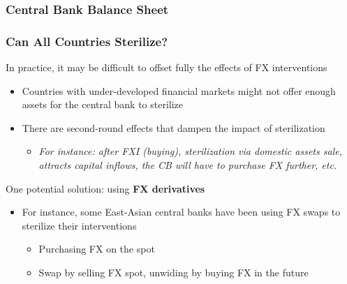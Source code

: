 \documentclass{beamer}
\newenvironment{wideitemize}{\itemize\addtolength{\itemsep}{10pt}}{\enditemize}
\begin{document}
\begin{frame}
\frametitle{Central Bank Balance Sheet}
\end{frame}


\begin{frame}
  \frametitle{Can All Countries Sterilize?}
  \begin{wideitemize}
  \item In practice, it may be difficult to offset fully the effects of FX interventions
    \begin{itemize}
    \item Countries with under-developed financial markets might not offer enough assets for the central bank to sterilize
    \item There are second-round effects that dampen the impact of sterilization
      \begin{itemize}
      \item \emph{For instance: after FXI (buying), sterilization via domestic assets sale, attracts capital inflows, the CB will have to purchase FX further, etc.}
      \end{itemize}
    \end{itemize}
  \item One potential solution: using \textbf{FX derivatives}
    \begin{itemize}
    \item For instance, some East-Asian central banks have been using FX swaps to sterilize their interventions
      \begin{itemize}
      \item Purchasing FX on the spot
      \item Swap by selling FX spot, unwiding by buying FX in the future
      \end{itemize}
    \end{itemize}
  \end{wideitemize}
\end{frame}
\end{document}

